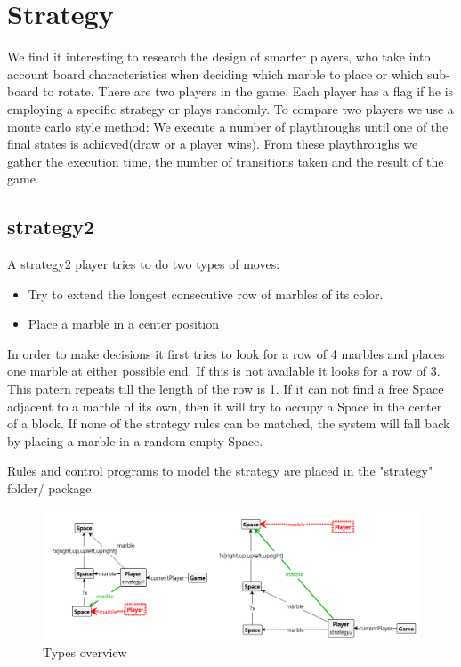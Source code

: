 \section{Strategy}
\label{Strategy}
We find it interesting to research the design of smarter players, who take into account board characteristics when deciding which marble to place or which sub-board to rotate.
There are two players in the game. Each player has a flag if he is employing a specific strategy or plays randomly. 
To compare two players we use a monte carlo style method: We execute a number of playthroughs until one of the final states is achieved(draw or a player wins).
From these playthroughs we gather the execution time, the number of transitions taken and the result of the game.

\vspace{6pt}
\subsection{strategy2}

A strategy2 player tries to do two types of moves:
\begin{itemize}
\item Try to extend the longest consecutive row of marbles of its color.
\item Place a marble in a center position
\end{itemize}

In order to make decisions it first tries to look for a row of 4 marbles and places one marble at either possible end. If this is not available it looks for a row of 3. This patern repeats till the length of the row is 1.
If it can not find a free Space adjacent to a marble of its own, then it will try to occupy a Space in the center of a block.
If none of the strategy rules can be matched, the system will fall back by placing a marble in a random empty Space.

Rules and control programs to model the strategy are placed in the "strategy" folder/ package.

\begin{figure}[!h]
  \includegraphics[scale=0.5,clip]{Images/twocombined.png}
  \caption{Types overview}
  \label{fig:twocombined}
\end{figure}

